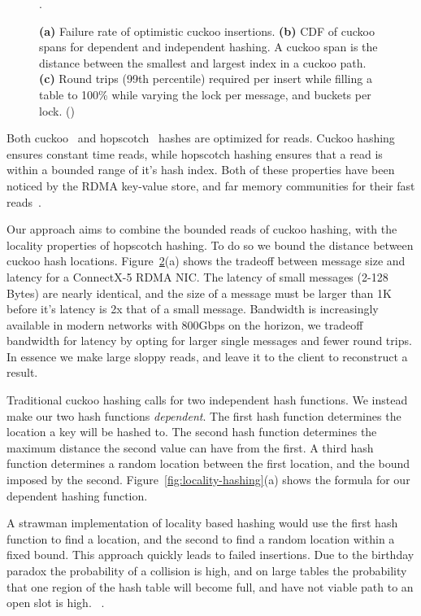 \begin{figure}[t]
\begin{subfigure}{0.3\linewidth}
        \label{fig:tbd}
    \end{subfigure}.
    \vspace{-1em}
    \caption{
    \textbf{(a)} Failure rate of optimistic cuckoo insertions.
    \textbf{(b)} CDF of cuckoo spans for dependent and independent hashing. A cuckoo span is the distance between the smallest and largest index in a cuckoo path.
    \textbf{(c)} Round trips (99th percentile) required per insert while filling a table to 100\% while varying the lock per message, and buckets per lock. ()
    }
    \label{fig:rdma}

\end{figure}


Both cuckoo~\cite{cuckoo} and hopscotch~\cite{hopscotch}
hashes are optimized for reads. Cuckoo hashing ensures
constant time reads, while hopscotch hashing ensures that a
read is within a bounded range of it's hash index. Both of
these properties have been noticed by the RDMA key-value
store, and far memory communities for their fast
reads~\cite{memc3,cuckoo-improvements,pilaf,farm}.

Our approach aims to combine the bounded reads of cuckoo
hashing, with the locality properties of hopscotch hashing.
To do so we bound the distance between cuckoo hash
locations. Figure~\ref{fig:rdma}(a) shows the tradeoff
between message size and latency for a ConnectX-5 RDMA NIC.
The latency of small messages (2-128 Bytes) are nearly
identical, and the size of a message must be larger than 1K
before it's latency is 2x that of a small message. Bandwidth
is increasingly available in modern networks with 800Gbps on
the horizon, we tradeoff bandwidth for latency by opting for
larger single messages and fewer round trips. In essence we
make large sloppy reads, and leave it to the client to
reconstruct a result.

Traditional cuckoo hashing calls for two independent hash
functions. We instead make our two hash functions
\textit{dependent}. The first hash function determines the
location a key will be hashed to. The second hash function
determines the maximum distance the second value can have
from the first. A third hash function determines a random
location between the first location, and the bound imposed
by the second. Figure~\ref{fig:locality-hashing}(a) shows
the formula for our dependent hashing function.

A strawman implementation of locality based hashing would
use the first hash function to find a location, and the
second to find a random location within a fixed bound. This
approach quickly leads to failed insertions. Due to the
birthday paradox the probability of a collision is high, and
on large tables the probability that one region of the hash
table will become full, and have not viable path to an open
slot is high. ~.

